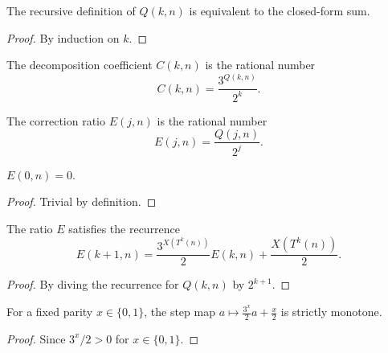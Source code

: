 \begin{lemma}\label{lemma:decomposition_correction_eq_sum}\leanok
The recursive definition of $Q(k, n)$ is equivalent to the closed-form sum.
\end{lemma}
\begin{proof}\leanok
By induction on $k$.
\end{proof}

\begin{definition}\label{def:C}\leanok
The decomposition coefficient $C(k, n)$ is the rational number
\begin{equation}
    C(k, n) = \frac{3^{Q(k, n)}}{2^k}.
\end{equation}
\end{definition}

\begin{definition}\label{def:E}\leanok
The correction ratio $E(j, n)$ is the rational number
\begin{equation}
    E(j, n) = \frac{Q(j, n)}{2^j}.
\end{equation}
\end{definition}

\begin{lemma}\label{lemma:E_zero}\leanok
$E(0, n) = 0$.
\end{lemma}
\begin{proof}\leanok
Trivial by definition.
\end{proof}

\begin{lemma}\label{lemma:E_succ}\leanok
The ratio $E$ satisfies the recurrence
\begin{equation}
    E(k+1, n) = \frac{3^{X(T^k(n))}}{2} E(k, n) + \frac{X(T^k(n))}{2}.
\end{equation}
\end{lemma}
\begin{proof}\leanok
By diving the recurrence for $Q(k, n)$ by $2^{k+1}$.
\end{proof}

\begin{lemma}\label{lemma:E_step_strict_mono}\leanok
For a fixed parity $x \in \{0, 1\}$, the step map $a \mapsto \frac{3^x}{2} a + \frac{x}{2}$ is strictly monotone.
\end{lemma}
\begin{proof}\leanok
Since $3^x/2 > 0$ for $x \in \{0, 1\}$.
\end{proof}

